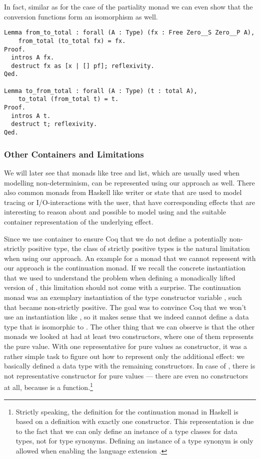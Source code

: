 \noindent
In fact, similar as for the case of the partiality monad we can even
show that the conversion functions form an isomorphism as well.

\begin{verbatim}
Lemma from_to_total : forall (A : Type) (fx : Free Zero__S Zero__P A),
    from_total (to_total fx) = fx.
Proof.
  intros A fx.
  destruct fx as [x | [] pf]; reflexivity.
Qed.

Lemma to_from_total : forall (A : Type) (t : total A),
    to_total (from_total t) = t.
Proof.
  intros A t.
  destruct t; reflexivity.
Qed.
\end{verbatim}

\subsubsection{Other Containers and Limitations}

We will later see that monads like tree and list, which are usually
used when modelling non-determinism, can be represented using our
approach as well.
There also common monads from Haskell like writer or state that are
used to model tracing or I/O-interactions with the user, that have
corresponding effects that are interesting to reason about and
possible to model using  and the suitable container
representation of the underlying effect.

Since we use container to ensure Coq that we do not define a
potentially non-strictly positive type, the class of strictly positive
types is the natural limitation when using our approach.
An example for a monad that we cannot represent with our approach is
the continuation monad.
If we recall the concrete instantiation that we used to understand the
problem when defining a monadically lifted version of ,
this limitation should not come with a surprise.
The continuation monad  was an exemplary instantiation of
the type constructor variable , such that  became
non-strictly positive.
The goal was to convince Coq that we won't use an instantiation like
, so it makes sense that we indeed cannot define a data
type that is isomorphic to . 
The other thing that we can observe is that the other monads we looked
at had at least two constructors, where one of them represents the
pure value.
With one representative for pure values as constructor, it was a
rather simple task to figure out how to represent only the additional
effect: we basically defined a data type with the remaining
constructors.
In case of , there is not representative constructor for
pure values --- there are even no constructors at all, because
 is a function.\footnote{Strictly speaking, the definition
  for the continuation monad in Haskell is based on a 
  definition with exactly one constructor. This representation is due
  to the fact that we can only define an instance of a type classes
  for data types, not for type synonyms. Defining an instance of a type
synonym is only allowed when enabling the language extension
.}

